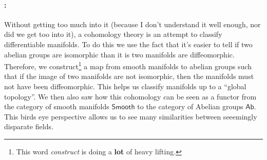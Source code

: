 \documentclass{homework}
\begin{document}
\paragraph{:}
Without getting too much into it (because I don't understand it well enough, nor did we get too into it), a cohomology theory is an attempt to classify differentiable manifolds.
To do this we use the fact that it's easier to tell if two abelian groups are isomorphic than it is two manifolds are diffeomorphic.
Therefore, we construct\footnote{This word \emph{construct} is doing a \textbf{lot} of heavy lifting.} a map from smooth manifolds to abelian groups such that if the image of two manifolds are not isomorphic, then the manifolds must not have been diffeomorphic.
This helps us classify manifolds up to a ``global topology''.
We then also saw how this cohomology can be seen as a functor from the category of smooth manifolds $\mathsf{Smooth}$ to the category of Abelian groups $\mathsf{Ab}$.
This birds eye perspective allows us to see many similarities between seeemingly disparate fields.
\end{document}
